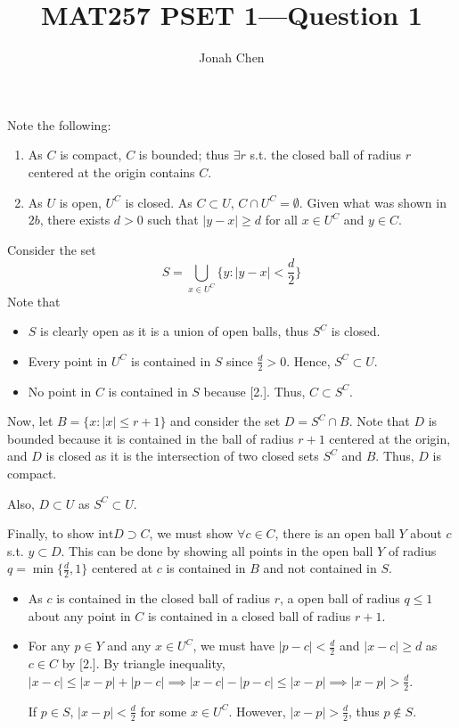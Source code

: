 \documentclass[a4paper]{article}
\title{MAT257 PSET 1---Question 1}
\author{Jonah Chen}
\numberwithin{equation}{section}
\begin{document}
    \sffamily
    Note the following:
    \begin{enumerate}
        \item As $C$ is compact, $C$ is bounded; thus $\exists r$ s.t. the closed ball of radius $r$ centered at the origin contains $C$. 
        \item As $U$ is open, $U^C$ is closed. As $C\subset U$, $C\cap U^C=\emptyset$. Given what was shown in $2b$, there exists $d>0$ such that $|y-x|\geq d$ for all $x\in U^C$ and $y\in C$.  
    \end{enumerate}

    Consider the set $$S=\bigcup_{x\in U^C}\{y:|y-x|<\frac{d}{2}\}$$ Note that 
    \begin{itemize}
        \item $S$ is clearly open as it is a union of open balls, thus $S^C$ is closed.
        \item Every point in $U^C$ is contained in $S$ since $\frac{d}{2}>0$. Hence, $S^C\subset U$.
        \item No point in $C$ is contained in $S$ because [2.]. Thus, $C\subset S^C$.  
    \end{itemize}
    
    
    Now, let $B=\{x:|x|\leq r+1\}$ and consider the set $D=S^C\cap B$. Note that $D$ is bounded because it is contained in the ball of radius $r+1$ centered at the origin, and $D$ is closed as it is the intersection of two closed sets $S^C$ and $B$. Thus, $D$ is compact.
    
    Also, $D\subset U$ as $S^C\subset U$.

    Finally, to show $\mathrm{int} D\supset C$, we must show $\forall c\in C$, there is an open ball $Y$ about $c$ s.t. $y\subset D$. This can be done by showing all points in the open ball $Y$ of radius $q=\min\{\frac{d}{2}, 1\}$ centered at $c$ is contained in $B$ and not contained in $S$.
    \begin{itemize}
        \item As $c$ is contained in the closed ball of radius $r$, a open ball of radius $q\leq 1$ about any point in $C$ is contained in a closed ball of radius $r+1$.
        \item For any $p\in Y$ and any $x\in U^C$, we must have $|p-c|<\frac{d}{2}$ and $|x-c|\geq d$ as $c\in C$ by [2.]. By triangle inequality, $|x-c|\leq|x-p|+|p-c|\implies|x-c|-|p-c|\leq|x-p|\implies|x-p|>\frac{d}{2}$. 
        
        If $p\in S$, $|x-p|<\frac{d}{2}$ for some $x\in U^C$. However, $|x-p|>\frac{d}{2}$, thus $p\notin S$.
    \end{itemize}
\end{document}
